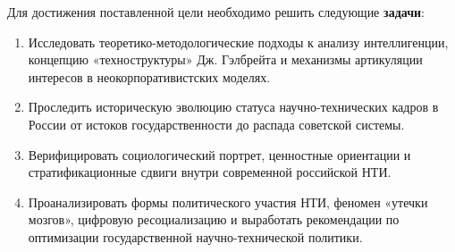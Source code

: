 Для достижения поставленной цели необходимо решить следующие \textbf{задачи}:
\begin{enumerate}
    \item Исследовать теоретико-методологические подходы к анализу интеллигенции, концепцию «техноструктуры» Дж. Гэлбрейта и механизмы артикуляции интересов в неокорпоративистских моделях.
    \item Проследить историческую эволюцию статуса научно-технических кадров в России от истоков государственности до распада советской системы.
    \item Верифицировать социологический портрет, ценностные ориентации и стратификационные сдвиги внутри современной российской НТИ.
    \item Проанализировать формы политического участия НТИ, феномен «утечки мозгов», цифровую ресоциализацию и выработать рекомендации по оптимизации государственной научно-технической политики.
\end{enumerate}